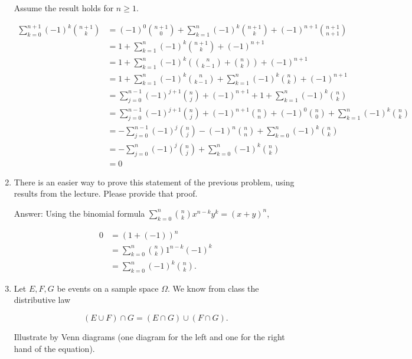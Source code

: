 \documentclass{article}
\begin{document}
\begin{enumerate}
Assume the result holds for $n \geq 1$.

\begin{align*}
\sum_{k=0}^{n+1} (-1)^k \binom{n+1}{k}
&= (-1)^0\binom{n+1}{0} + \sum_{k=1}^{n} (-1)^k \binom{n+1}{k} + (-1)^{n+1}\binom{n+1}{n+1} \\
&= 1 + \sum_{k=1}^{n} (-1)^k \binom{n+1}{k} + (-1)^{n+1} \\
&= 1 + \sum_{k=1}^{n} (-1)^k\left( \binom{n}{k-1} + \binom{n}{k}\right) + (-1)^{n+1} \\
&= 1 + \sum_{k=1}^{n} (-1)^k\binom{n}{k-1} + \sum_{k=1}^n (-1)^k\binom{n}{k} + (-1)^{n+1} \\
&=  \sum_{j=0}^{n-1} (-1)^{j+1}\binom{n}{j} + (-1)^{n+1}  + 1 + \sum_{k=1}^n (-1)^k\binom{n}{k}  \\
&=  \sum_{j=0}^{n-1} (-1)^{j+1}\binom{n}{j} + (-1)^{n+1}\binom{n}{n}  + (-1)^0\binom{n}{0} + \sum_{k=1}^n (-1)^k\binom{n}{k}  \\
&=  -\sum_{j=0}^{n-1} (-1)^{j}\binom{n}{j} - (-1)^{n}\binom{n}{n}  + \sum_{k=0}^n (-1)^k\binom{n}{k}  \\
&= -\sum_{j=0}^{n} (-1)^{j}\binom{n}{j} + \sum_{k=0}^n (-1)^k\binom{n}{k}  \\
&= 0
\end{align*}
 
\newpage

\item There is an easier way to prove this statement of the previous problem, using results
from the lecture. Please provide that proof.

Answer: Using the binomial formula $\sum_{k=0}^n \binom{n}{k} x^{n-k}y^k = (x+y)^n$, 

\begin{align*}
0 &= (1 + (-1))^n \\
&= \sum_{k=0}^n \binom{n}{k}1^{n-k}(-1)^{k} \\
&= \sum_{k=0}^n (-1)^k\binom{n}{k} . 
\end{align*}

\newpage

\item

Let $E, F, G$ be events on a sample space $\Omega$. We know from class the distributive law

$$(E \cup F) \cap G = (E \cap G) \cup (F \cap G). $$

Illustrate by Venn diagrams (one diagram for the left and one for the right hand of the
equation).


\end{enumerate}
\end{document}
